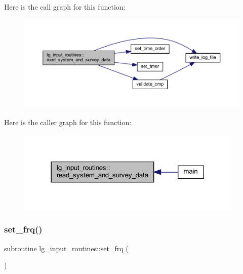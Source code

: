 Here is the call graph for this function\+:\nopagebreak
\begin{figure}[H]
\begin{center}
\leavevmode
\includegraphics[width=350pt]{namespacelg__input__routines_a80feb058541516d5a6327fb6c344bbbd_cgraph}
\end{center}
\end{figure}
Here is the caller graph for this function\+:\nopagebreak
\begin{figure}[H]
\begin{center}
\leavevmode
\includegraphics[width=306pt]{namespacelg__input__routines_a80feb058541516d5a6327fb6c344bbbd_icgraph}
\end{center}
\end{figure}
\mbox{\label{namespacelg__input__routines_a836674acd30d52d3aa973722014aaa9f}} 
\subsubsection{\texorpdfstring{set\+\_\+frq()}{set\_frq()}}
{\footnotesize\ttfamily subroutine lg\+\_\+input\+\_\+routines\+::set\+\_\+frq (\begin{DoxyParamCaption}{ }\end{DoxyParamCaption})}

